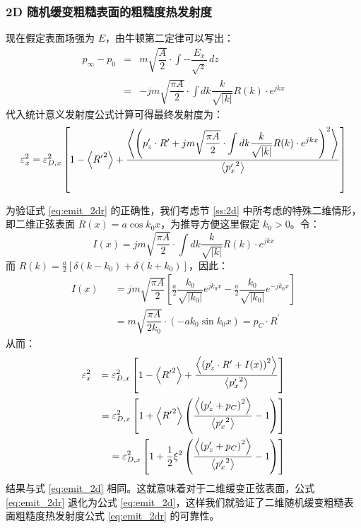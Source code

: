 \subsubsection{2D 随机缓变粗糙表面的粗糙度热发射度}

现在假定表面场强为 $E$，由牛顿第二定律可以写出：
\begin{eqnarray}
p_{\infty}-p_0 &=& m\sqrt{\dfrac{A}{2}}\cdot\int-\dfrac{E_x}{\sqrt{z}}\,dz\nonumber\\
&=& -jm\sqrt{\dfrac{\pi A}{2}}\cdot\int dk \dfrac{k}{\sqrt{|k|}}R(k)\cdot e^{jkx}\label{eq:p_field}
\end{eqnarray}
代入统计意义发射度公式计算可得最终发射度为：
\begin{equation}
\varepsilon_x^2 = \varepsilon_{D, x}^2\left[1-\left\langle{{R^{\prime}}^2}\right\rangle+\dfrac{\left\langle{\left(p_z^{\prime}\cdot R^{\prime}+jm\sqrt{\dfrac{\pi A}{2}}\displaystyle\cdot\int dk \dfrac{k}{\sqrt{|k|}}R(k)\cdot e^{jkx}\right)^2}\right\rangle}{\left\langle{{p_x^{\prime}}^2}\right\rangle}\right]
\label{eq:emit_2dr}
\end{equation}

为验证式 \ref{eq:emit_2dr} 的正确性，我们考虑节 \ref{ss:2d} 中所考虑的特殊二维情形，即二维正弦表面 $R(x) = a\cos k_0x$，为推导方便这里假定 $k_0>0$。令：
\[
I(x) = jm\sqrt{\dfrac{\pi A}{2}}\displaystyle\cdot\int dk \dfrac{k}{\sqrt{|k|}}R(k)\cdot e^{jkx}
\]
而 $R(k)=\frac{a}{2}\left[\delta(k-k_0)+\delta(k+k_0)\right]$，因此：
\begin{eqnarray*}
I(x) &&= jm\sqrt{\dfrac{\pi A}{2}}\left[\frac{a}{2}\dfrac{k_0}{\sqrt{|k_0|}}e^{jk_0x}-\frac{a}{2}\dfrac{k_0}{\sqrt{|k_0|}}e^{-jk_0x}\right]\\
&&= m\sqrt{\dfrac{\pi A}{2k_0}}\cdot(-ak_0\sin k_0x) = p_C\cdot R^{\prime}
\end{eqnarray*}
从而：
\begin{eqnarray*}
\varepsilon_x^2 &&= \varepsilon_{D, x}^2\left[1-\left\langle{{R^{\prime}}^2}\right\rangle+\dfrac{\left\langle{\left(p_z^{\prime}\cdot R^{\prime}+I(x)\right)^2}\right\rangle}{\left\langle{{p_x^{\prime}}^2}\right\rangle}\right]\\
&&= \varepsilon_{D, x}^2\left[1+\left\langle{{R^{\prime}}^2}\right\rangle\left(\dfrac{\left\langle{\left(p_z^{\prime}+p_C\right)^2}\right\rangle}{\left\langle{{p_x^{\prime}}^2}\right\rangle}-1\right)\right]\\
&&= \varepsilon_{D, x}^2\left[1+\dfrac{1}{2}\xi^2\left(\dfrac{\left\langle{\left(p_z^{\prime}+p_C\right)^2}\right\rangle}{\left\langle{{p_x^{\prime}}^2}\right\rangle}-1\right)\right]
\end{eqnarray*}
结果与式 \ref{eq:emit_2d} 相同。这就意味着对于二维缓变正弦表面，公式 \ref{eq:emit_2dr} 退化为公式 \ref{eq:emit_2d}，这样我们就验证了二维随机缓变粗糙表面粗糙度热发射度公式 \ref{eq:emit_2dr} 的可靠性。

